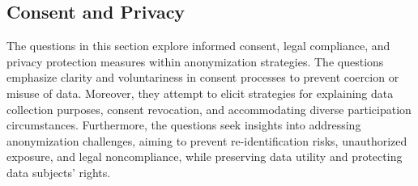 \subsection{Consent and Privacy} 
The questions in this section explore informed consent, legal compliance, and privacy
protection measures within anonymization strategies. The questions emphasize clarity
and voluntariness in consent processes to prevent coercion or misuse of data. Moreover,
they attempt to elicit strategies for explaining data collection purposes, consent
revocation, and accommodating diverse participation circumstances. Furthermore, the
questions seek insights into addressing anonymization challenges, aiming to prevent
re-identification risks, unauthorized exposure, and legal noncompliance, while
preserving data utility and protecting data subjects' rights.

